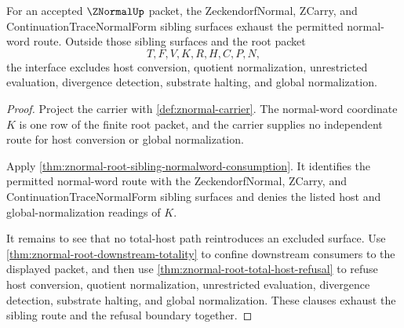 \begin{theorem}
\label{thm:znormal-root-sibling-refusal-exhaustion}
For an accepted $\ZNormalUp$ packet, the ZeckendorfNormal, ZCarry, and ContinuationTraceNormalForm sibling surfaces exhaust the permitted normal-word route. Outside those sibling surfaces and the root packet
$$
T,F,V,K,R,H,C,P,N,
$$
the interface excludes host conversion, quotient normalization, unrestricted evaluation, divergence detection, substrate halting, and global normalization.
\end{theorem}
\begin{proof}
Project the carrier with \autoref{def:znormal-carrier}. The normal-word coordinate $K$ is one row of the finite root packet, and the carrier supplies no independent route for host conversion or global normalization.

Apply \autoref{thm:znormal-root-sibling-normalword-consumption}. It identifies the permitted normal-word route with the ZeckendorfNormal, ZCarry, and ContinuationTraceNormalForm sibling surfaces and denies the listed host and global-normalization readings of $K$.

It remains to see that no total-host path reintroduces an excluded surface. Use \autoref{thm:znormal-root-downstream-totality} to confine downstream consumers to the displayed packet, and then use \autoref{thm:znormal-root-total-host-refusal} to refuse host conversion, quotient normalization, unrestricted evaluation, divergence detection, substrate halting, and global normalization. These clauses exhaust the sibling route and the refusal boundary together.
\end{proof}
